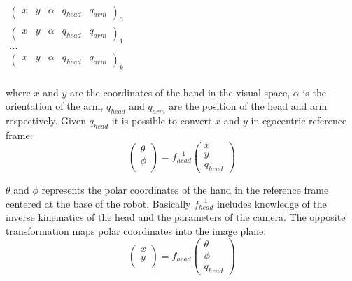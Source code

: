 \begin{center}
\begin{math}
  \begin{array}{c}
  \left(\begin{array}{ccccc}
    x & y & \alpha &q_{head} &q_{arm} \end{array}\right)_0\\
  \left(\begin{array}{ccccc}
    x & y & \alpha &q_{head} &q_{arm} \end{array}\right)_1\\
  ...\\
  \left(\begin{array}{ccccc}
    x & y & \alpha &q_{head} &q_{arm} \end{array}\right)_k\\
\end{array}
\end{math}
\end{center}

where $x$ and $y$ are the coordinates of the hand in the visual space,
$\alpha$ is the orientation of the arm, $q_{head}$ and $q_{arm}$ are 
the position of the head and arm respectively. Given $q_{head}$ it is
possible to convert $x$ and $y$ in egocentric reference frame:
\begin{equation}
  \left(\begin{array}{c}
    \theta \\
    \phi \\
    \end{array}\right)
  = f_{head}^{-1}
  \left(\begin{array}{c}
    x \\
    y \\
    q_{head}
    \end{array} \right)
\label{eq-head-inverse}
\end{equation}

$\theta$ and $\phi$ represents the polar coordinates of the hand in the
reference frame centered at the base of the robot. Basically 
$f_{head}^{-1}$ includes knowledge of the inverse kinematics of the 
head and the parameters of the camera. The opposite transformation maps 
polar coordinates into the image plane:
\begin{equation}
  \left(\begin{array}{c}
    x \\
    y \\
    \end{array}\right)
  = f_{head}
  \left(\begin{array}{c}
    \theta \\
    \phi \\
    q_{head}
    \end{array} \right)
\label{eq-head-direct}
\end{equation}

